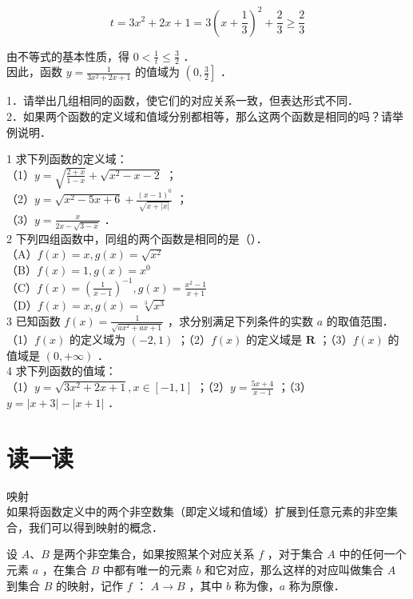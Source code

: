 \documentclass[10pt]{article}
\begin{document}
\[
t=3 x^{2}+2 x+1=3\left(x+\frac{1}{3}\right)^{2}+\frac{2}{3} \geqslant \frac{2}{3}
\]

由不等式的基本性质，得 \(0<\frac{1}{t} \leqslant \frac{3}{2}\) ．\\
因此，函数 \(y=\frac{1}{3 x^{2}+2 x+1}\) 的值域为 \(\left(0, \frac{3}{2}\right]\) ．

1．请举出几组相同的函数，使它们的对应关系一致，但表达形式不同．\\
2．如果两个函数的定义域和值域分别都相等，那么这两个函数是相同的吗？请举例说明．

1 求下列函数的定义域：\\
（1）\(y=\sqrt{\frac{2+x}{1-x}}+\sqrt{x^{2}-x-2}\) ；\\
（2）\(y=\sqrt{x^{2}-5 x+6}+\frac{(x-1)^{0}}{\sqrt{x+|x|}}\) ；\\
（3）\(y=\frac{x}{2 x-\sqrt{3-x}}\) ．\\
2 下列四组函数中，同组的两个函数是相同的是（）．\\
（A）\(f(x)=x, g(x)=\sqrt{x^{2}}\)\\
（B）\(f(x)=1, g(x)=x^{0}\)\\
（C）\(f(x)=\left(\frac{1}{x-1}\right)^{-1}, g(x)=\frac{x^{2}-1}{x+1}\)\\
（D）\(f(x)=x, g(x)=\sqrt[3]{x^{3}}\)\\
3 已知函数 \(f(x)=\frac{1}{\sqrt{a x^{2}+a x+1}}\) ，求分别满足下列条件的实数 \(a\) 的取值范围．\\
（1）\(f(x)\) 的定义域为 \((-2,1)\) ；（2）\(f(x)\) 的定义域是 \(\mathbf{R}\) ；（3）\(f(x)\) 的值域是 \((0,+\infty)\) ．\\
4 求下列函数的值域：\\
（1）\(y=\sqrt{3 x^{2}+2 x+1}, x \in[-1,1]\) ；（2）\(y=\frac{5 x+4}{x-1}\) ；（3）\(y=|x+3|-|x+1|\) ．

\section*{读一读}
咉射\\
如果将函数定义中的两个非空数集（即定义域和值域）扩展到任意元素的非空集合，我们可以得到映射的概念．

设 \(A 、 B\) 是两个非空集合，如果按照某个对应关系 \(f\) ，对于集合 \(A\) 中的任何一个元素 \(a\) ，在集合 \(B\) 中都有唯一的元素 \(b\) 和它对应，那么这样的对应叫做集合 \(A\) 到集合 \(B\) 的映射，记作 \(f\) ： \(A \rightarrow B\) ，其中 \(b\) 称为像，\(a\) 称为原像．
\end{document}
